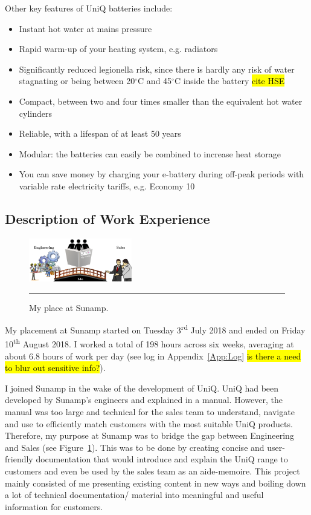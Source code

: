 Other key features of UniQ batteries include:
\begin{itemize}
	\item Instant hot water at mains pressure
	\item Rapid warm-up of your heating system, e.g. radiators
	\item Significantly reduced legionella risk, since there is hardly any risk of water stagnating or being between 20$^{\circ}$C and 45$^{\circ}$C inside the battery \hl{cite HSE}
	\item Compact, between two and four times smaller than the equivalent hot water cylinders
	\item Reliable, with a lifespan of at least 50 years
	\item Modular: the batteries can easily be combined to increase heat storage
	\item You can save money by charging your e-battery during off-peak periods with variable rate electricity tariffs, e.g. Economy 10
\end{itemize}



\newpage
\subsection*{Description of Work Experience}

\begin{figure}
	\includegraphics[width=0.4\textwidth]{figures/bridge.png}
	\rule{0.4\textwidth}{0.5pt} %
	\caption{My place at Sunamp.}
	\label{fig:bridge}
\end{figure}

My placement at Sunamp started on Tuesday 3\textsuperscript{rd} July 2018 and ended on Friday 10\textsuperscript{th} August 2018.
I worked a total of 198 hours across six weeks, averaging at about 6.8 hours of work per day (see log in Appendix~\ref{App:Log} \hl{is there a need to blur out sensitive info?}).

I joined Sunamp in the wake of the development of UniQ.
UniQ had been developed by Sunamp's engineers and explained in a manual.
However, the manual was too large and technical for the sales team to understand, navigate and use to efficiently match customers with the most suitable UniQ products.
Therefore, my purpose at Sunamp was to bridge the gap between Engineering and Sales (see Figure~\ref{fig:bridge}).
This was to be done by creating concise and user-friendly documentation that would introduce and explain the UniQ range to customers and even be used by the sales team as an aide-memoire.
This project mainly consisted of me presenting existing content in new ways and boiling down a lot of technical documentation/ material into meaningful and useful information for customers.

